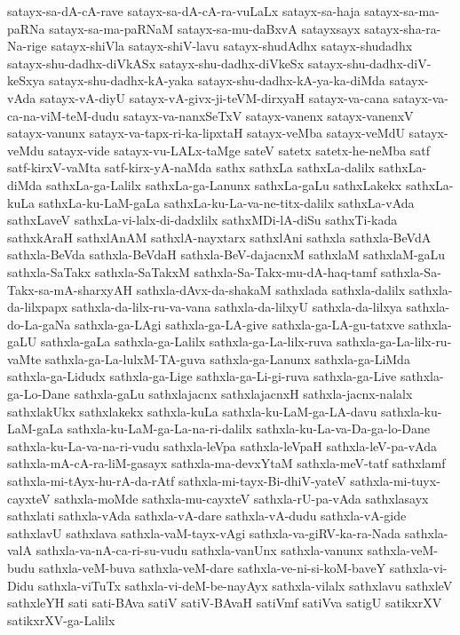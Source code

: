 {satayx-sa-dA-cA-rave
satayx-sa-dA-cA-ra-vuLaLx
satayx-sa-haja
satayx-sa-ma-paRNa
satayx-sa-ma-paRNaM
satayx-sa-mu-daBxvA
satayxsayx
satayx-sha-ra-Na-rige
satayx-shiVla
satayx-shiV-lavu
satayx-shudAdhx
satayx-shudadhx
satayx-shu-dadhx-diVkASx
satayx-shu-dadhx-diVkeSx
satayx-shu-dadhx-diV-keSxya
satayx-shu-dadhx-kA-yaka
satayx-shu-dadhx-kA-ya-ka-diMda
satayx-vAda
satayx-vA-diyU
satayx-vA-givx-ji-teVM-dirxyaH
satayx-va-cana
satayx-va-ca-na-viM-teM-dudu
satayx-va-nanxSeTxV
satayx-vanenx
satayx-vanenxV
satayx-vanunx
satayx-va-tapx-ri-ka-lipxtaH
satayx-veMba
satayx-veMdU
satayx-veMdu
satayx-vide
satayx-vu-LALx-taMge
sateV
satetx
satetx-he-neMba
satf
satf-kirxV-vaMta
satf-kirx-yA-naMda
sathx
sathxLa
sathxLa-dalilx
sathxLa-diMda
sathxLa-ga-Lalilx
sathxLa-ga-Lanunx
sathxLa-gaLu
sathxLakekx
sathxLa-kuLa
sathxLa-ku-LaM-gaLa
sathxLa-ku-La-va-ne-titx-dalilx
sathxLa-vAda
sathxLaveV
sathxLa-vi-lalx-di-dadxlilx
sathxMDi-lA-diSu
sathxTi-kada
sathxkAraH
sathxlAnAM
sathxlA-nayxtarx
sathxlAni
sathxla
sathxla-BeVdA
sathxla-BeVda
sathxla-BeVdaH
sathxla-BeV-dajacnxM
sathxlaM
sathxlaM-gaLu
sathxla-SaTakx
sathxla-SaTakxM
sathxla-Sa-Takx-mu-dA-haq-tamf
sathxla-Sa-Takx-sa-mA-sharxyAH
sathxla-dAvx-da-shakaM
sathxlada
sathxla-dalilx
sathxla-da-lilxpapx
sathxla-da-lilx-ru-va-vana
sathxla-da-lilxyU
sathxla-da-lilxya
sathxla-do-La-gaNa
sathxla-ga-LAgi
sathxla-ga-LA-give
sathxla-ga-LA-gu-tatxve
sathxla-gaLU
sathxla-gaLa
sathxla-ga-Lalilx
sathxla-ga-La-lilx-ruva
sathxla-ga-La-lilx-ru-vaMte
sathxla-ga-La-lulxM-TA-guva
sathxla-ga-Lanunx
sathxla-ga-LiMda
sathxla-ga-Lidudx
sathxla-ga-Lige
sathxla-ga-Li-gi-ruva
sathxla-ga-Live
sathxla-ga-Lo-Dane
sathxla-gaLu
sathxlajacnx
sathxlajacnxH
sathxla-jacnx-nalalx
sathxlakUkx
sathxlakekx
sathxla-kuLa
sathxla-ku-LaM-ga-LA-davu
sathxla-ku-LaM-gaLa
sathxla-ku-LaM-ga-La-na-ri-dalilx
sathxla-ku-La-va-Da-ga-lo-Dane
sathxla-ku-La-va-na-ri-vudu
sathxla-leVpa
sathxla-leVpaH
sathxla-leV-pa-vAda
sathxla-mA-cA-ra-liM-gasayx
sathxla-ma-devxYtaM
sathxla-meV-tatf
sathxlamf
sathxla-mi-tAyx-hu-rA-da-rAtf
sathxla-mi-tayx-Bi-dhiV-yateV
sathxla-mi-tuyx-cayxteV
sathxla-moMde
sathxla-mu-cayxteV
sathxla-rU-pa-vAda
sathxlasayx
sathxlati
sathxla-vAda
sathxla-vA-dare
sathxla-vA-dudu
sathxla-vA-gide
sathxlavU
sathxlava
sathxla-vaM-tayx-vAgi
sathxla-va-giRV-ka-ra-Nada
sathxla-valA
sathxla-va-nA-ca-ri-su-vudu
sathxla-vanUnx
sathxla-vanunx
sathxla-veM-budu
sathxla-veM-buva
sathxla-veM-dare
sathxla-ve-ni-si-koM-baveY
sathxla-vi-Didu
sathxla-viTuTx
sathxla-vi-deM-be-nayAyx
sathxla-vilalx
sathxlavu
sathxleV
sathxleYH
sati
sati-BAva
satiV
satiV-BAvaH
satiVmf
satiVva
satigU
satikxrXV
satikxrXV-ga-Lalilx
}
